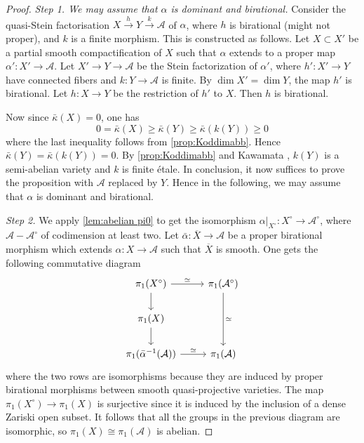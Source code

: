 \documentclass[11pt,english]{smfart}
\theoremstyle{plain}
\theoremstyle{definition}
\theoremstyle{remark}
\numberwithin{equation}{section}
\theoremstyle{plain}
\newcommand{\cA}{\mathcal A}
\begin{document}
\begin{proof}
	{\em Step 1. We may assume that \(\alpha\) is dominant and birational.}
	Consider the quasi-Stein factorisation $X\stackrel{h}{\to} Y\stackrel{k}{\to} \cA$  of $\alpha$, where $h$  is birational (might not proper), and $k$ is a finite morphism.  
	This is constructed as follows.
	Let $X\subset X'$ be a partial smooth compactification of $X$ such that $\alpha$ extends to a proper map $\alpha':X'\to \cA$.
	Let $X'\to Y\to\cA$ be the Stein factorization of $\alpha'$, where $h':X'\to Y$ have connected fibers and $k:Y\to\cA$ is finite.
	By $\dim X'=\dim Y$, the map $h'$ is birational.
	Let $h:X\to Y$ be the restriction of $h'$ to $X$.
	Then $h$ is birational.
	
	
	Now since   $\bar{\kappa}(X)= 0$, one has $$0=\bar{\kappa}(X)\geq\bar{\kappa}(Y)\geq \bar{\kappa}(k(Y))\geq 0$$ where the last inequality follows from \cref{prop:Koddimabb}.     
	Hence $\bar{\kappa}(Y)=\bar{\kappa}(k(Y))=0$.  By  \cref{prop:Koddimabb}    and Kawamata \cite[Theorem~26]{Kaw81},  $k(Y)$ is a semi-abelian variety and  $k$ is finite \'etale. In conclusion, it now suffices to prove the proposition with \(\cA\) replaced by \(Y\). 
	Hence in the following, we may assume that $\alpha$ is dominant and birational.
	
	\noindent
	{\em Step 2.}
	We apply \cref{lem:abelian pi0} to get the isomorphism $\alpha|_{X^{\circ}}:X^{\circ}\to \cA^{\circ}$, where $\cA-\cA^\circ$ of codimension at least two.
	Let $\bar{\alpha}:\overline{X}\to \cA$  be a  proper birational morphism which extends $\alpha:X\to \cA$ such that $\overline{X}$ is smooth.   One gets the following commutative diagram
	\begin{equation*}
		\begin{tikzcd}
			\pi_1( X^{\circ})\arrow[r, "\simeq"] \arrow[d] & \pi_1(\cA^{\circ})\arrow[dd, "\simeq"] \\
			\pi_1(X)  \arrow[d]& \\
			\pi_1(\bar{\alpha}^{-1}(\cA)) \arrow[r, "\simeq"] & \pi_1(\cA)
		\end{tikzcd}
	\end{equation*}
	where the two rows are isomorphisms because they are induced by   proper birational morphisms  between smooth quasi-projective varieties. The map \(\pi_{1}(X^\circ) \to \pi_{1}(X)\) is surjective since it is induced by the inclusion of a dense Zariski open subset. It follows that all the groups in the previous diagram are isomorphic, so \(\pi_{1}(X) \cong \pi_{1}(\cA)\) is abelian.
\end{proof} 
\end{document}
